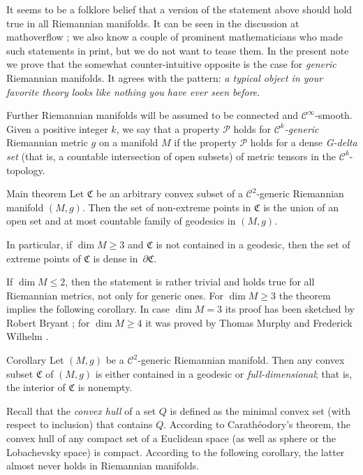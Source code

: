 \documentclass[a4paper,10pt]{article}
\begin{document}
It seems to be a folklore belief that a version of the statement above should hold true in all Riemannian manifolds.
It can be seen in the discussion at mathoverflow \cite{petrunin-2009}; we also know a couple of prominent mathematicians who made such statements in print, but we do not want to tease them.
In the present note we prove that the somewhat counter-intuitive opposite is the case for \emph{generic} Riemannian manifolds.
It agrees with the pattern: \emph{a typical object in your favorite theory looks like nothing you have ever seen before}.

Further Riemannian manifolds will be assumed to be connected and $\mathcal C^\infty$-smooth.
Given a positive integer $k$, we say that a property $\mathcal P$ holds for \emph{$\mathcal C^k$-generic} Riemannian metric $g$ on a manifold $M$ 
if the property $\mathcal P$ holds for a dense \emph{G-delta set} (that is, a countable intersection of open subsets) of metric tensors in the $\mathcal C^k$-topology.

\begin{thm}{Main theorem}\label{thm:main}
Let $\mathfrak C$ be an arbitrary convex subset of a $\mathcal C^2$-generic Riemannian manifold $(M,g)$.
Then the set of non-extreme points in $\mathfrak C$ is the union of an open set and at most countable family of geodesics in $(M,g)$. 

In particular, if $\dim M\ge 3$ and $\mathfrak C$ is not contained in a geodesic, then the set of
extreme points of $\mathfrak{C}$ is dense in~$\partial\mathfrak{C}$.
\end{thm}

If $\dim M \le 2$, then the statement is rather trivial and holds true  for all Riemannian metrics, not only for generic ones.
For $\dim M \ge  3$
the theorem implies the following corollary.
In case $\dim M=3$ its proof has been sketched by Robert Bryant \cite{Bryant}; for $\dim M\ge 4$ it was proved by Thomas Murphy and Frederick Wilhelm \cite{Wilhelm}.

\begin{thm}{Corollary}\label{cor:main}
Let $(M,g)$ be a $\mathcal C^2$-generic Riemannian manifold.
Then any convex subset $\mathfrak C$ of $(M,g)$ is either contained in a geodesic
or \emph{full-dimensional}; that is, the interior of $\mathfrak C$ is nonempty.
\end{thm}

Recall that the \emph{convex hull} of a set $Q$ is defined as the minimal convex set (with respect to inclusion) that contains $Q$.
According to Carathéodory's theorem, the convex hull of  any compact set of a Euclidean space (as well as sphere or the Lobachevsky space) is compact.
According to the following corollary, the latter almost never holds in Riemannian manifolds.
\end{document}
